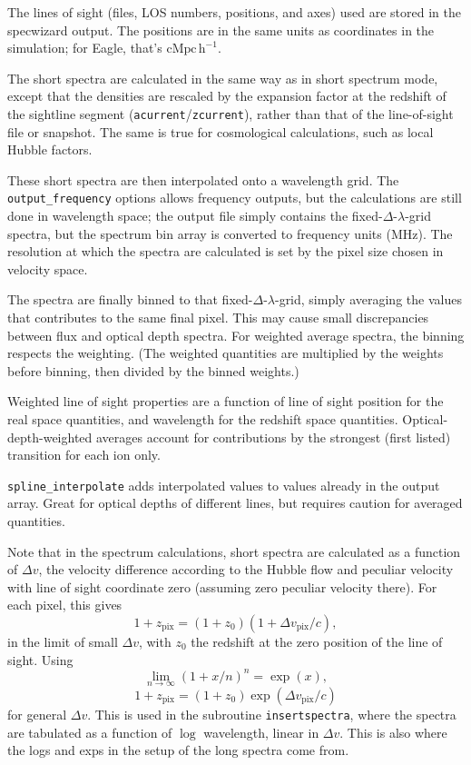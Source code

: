\documentclass{report}
\newcommand{\param}[1]{{\tt #1}}
\begin{document}
The lines of sight (files, LOS numbers, positions, and axes) used are stored in the specwizard output. The positions are in the same units as coordinates in the simulation; for Eagle, that's $\mathrm{cMpc} \, \mathrm{h}^{-1}$.

The short spectra are calculated in the same way as in short spectrum mode, except that the densities are rescaled by the expansion factor at the redshift of the sightline segment (\param{acurrent}/\param{zcurrent}), rather than that of the line-of-sight file or snapshot. The same is true for cosmological calculations, such as local Hubble factors.

These short spectra are then interpolated onto a wavelength grid. The \param{output\_frequency} options allows frequency outputs, but the calculations are still done in wavelength space; the output file simply contains the fixed-$\Delta$-$\lambda$-grid spectra, but the spectrum bin array is converted to frequency units (MHz). The resolution at which the spectra are calculated is set by the pixel size chosen in velocity space.

The spectra are finally binned to that fixed-$\Delta$-$\lambda$-grid, simply averaging the values that contributes to the same final pixel. This may cause small discrepancies between flux and optical depth spectra. For weighted average spectra, the binning respects the weighting. (The weighted quantities are multiplied by the weights before binning, then divided by the binned weights.)

Weighted line of sight properties are a function of line of sight position for the real space quantities, and wavelength for the redshift space quantities. Optical-depth-weighted averages account for contributions by the strongest (first listed) transition for each ion only.

\param{spline\_interpolate} adds interpolated values to values already in the output array. Great for optical depths of different lines, but requires caution for averaged quantities.  

Note that in the spectrum calculations, short spectra are calculated as a function of $\Delta v$, the velocity difference according to the Hubble flow and peculiar velocity with line of sight coordinate zero (assuming zero peculiar velocity there).
For each pixel, this gives 
\begin{equation}
1 + z_{\mathrm{pix}} = (1 + z_{0}) (1 + \Delta v_{\mathrm{pix}} / c),
\end{equation}
in the limit of small $\Delta v$, with $z_{0}$ the redshift at the zero position of the line of sight. Using 
\begin{equation}
\lim_{n \rightarrow \infty} \left(1 + x/n \right)^{n} = \exp(x),
\end{equation}  
\begin{equation}
1 + z_{\mathrm{pix}} = (1 + z_{0}) \exp(\Delta v_{\mathrm{pix}} / c)
\end{equation}
for general $\Delta v$. This is used in the subroutine \param{insertspectra}, where the spectra are tabulated as a function of $\log$ wavelength, linear in $\Delta v$. This is also where the logs and exps in the setup of the long spectra come from.
\end{document}
